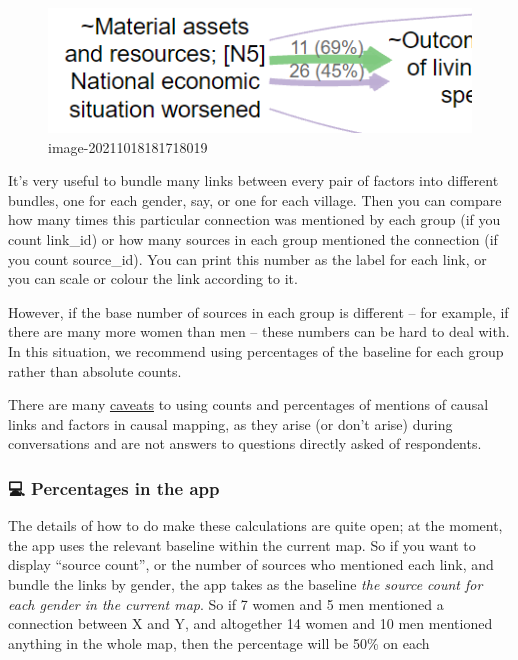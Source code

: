 \documentclass[
]{book}
\begin{document}
\begin{figure}
\centering
\includegraphics{_assets/image-20211018181718019.png}
\caption{image-20211018181718019}
\end{figure}

It's very useful to bundle many links between every pair of factors into different bundles, one for each gender, say, or one for each village. Then you can compare how many times this particular connection was mentioned by each group (if you count link\_id) or how many sources in each group mentioned the connection (if you count source\_id). You can print this number as the label for each link, or you can scale or colour the link according to it.

However, if the base number of sources in each group is different -- for example, if there are many more women than men -- these numbers can be hard to deal with. In this situation, we recommend using percentages of the baseline for each group rather than absolute counts.

There are many \protect\hyperlink{caveat-numbers}{caveats} to using counts and percentages of mentions of causal links and factors in causal mapping, as they arise (or don't arise) during conversations and are not answers to questions directly asked of respondents.

\hypertarget{percentages-in-the-app}{%
\subsubsection{💻 Percentages in the app}\label{percentages-in-the-app}}

The details of how to do make these calculations are quite open; at the moment, the app uses the relevant baseline within the current map. So if you want to display ``source count'', or the number of sources who mentioned each link, and bundle the links by gender, the app takes as the baseline \emph{the source count for each gender in the current map}. So if 7 women and 5 men mentioned a connection between X and Y, and altogether 14 women and 10 men mentioned anything in the whole map, then the percentage will be 50\% on each
\end{document}
